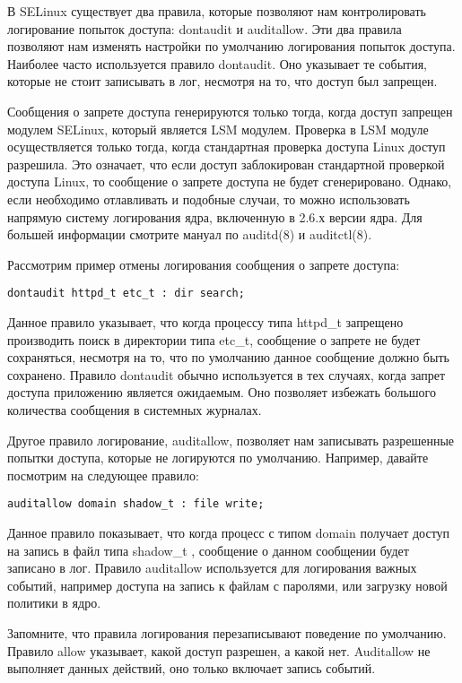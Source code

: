 \documentclass{./../class/UIR}
\begin{document}
    В SELinux существует два правила, которые позволяют нам контролировать
    логирование попыток доступа: dontaudit и auditallow. Эти два правила
    позволяют нам изменять настройки по умолчанию логирования попыток доступа.
    Наиболее часто используется правило dontaudit. Оно указывает те события,
    которые не стоит записывать в лог, несмотря на то, что доступ был запрещен.

    Сообщения о запрете доступа генерируются только тогда, когда доступ запрещен
    модулем SELinux, который является LSM модулем. Проверка в LSM модуле
    осуществляется только тогда, когда стандартная проверка доступа Linux доступ
    разрешила. Это означает, что если доступ заблокирован стандартной проверкой
    доступа Linux, то сообщение о запрете доступа не будет сгенерировано.
    Однако, если необходимо отлавливать и подобные случаи, то можно использовать
    напрямую систему логирования ядра, включенную в 2.6.х версии ядра. Для
    большей информации смотрите мануал по auditd(8) и auditctl(8).

    Рассмотрим пример отмены логирования сообщения о запрете доступа:
\begin{verbatim}
dontaudit httpd_t etc_t : dir search;
\end{verbatim}
    Данное правило указывает, что когда процессу типа httpd\_t запрещено
    производить поиск в директории типа etc\_t, сообщение о запрете не будет
    сохраняться, несмотря на то, что по умолчанию данное сообщение должно быть
    сохранено. Правило dontaudit обычно используется в тех случаях, когда запрет
    доступа приложению является ожидаемым. Оно позволяет избежать большого
    количества сообщения в системных журналах.

    Другое правило логирование, auditallow, позволяет нам записывать разрешенные
    попытки доступа, которые не логируются по умолчанию. Например, давайте
    посмотрим на следующее правило:
\begin{verbatim}
auditallow domain shadow_t : file write;
\end{verbatim}
    Данное правило показывает, что когда процесс с типом domain получает доступ
    на запись в файл типа shadow\_t , сообщение о данном сообщении будет
    записано в лог. Правило auditallow используется для логирования важных
    событий, например доступа на запись к файлам с паролями, или загрузку новой
    политики в ядро.

    Запомните, что правила логирования перезаписывают поведение по умолчанию.
    Правило allow указывает, какой доступ разрешен, а какой нет. Auditallow не
    выполняет данных действий, оно только включает запись событий.
\end{document}
